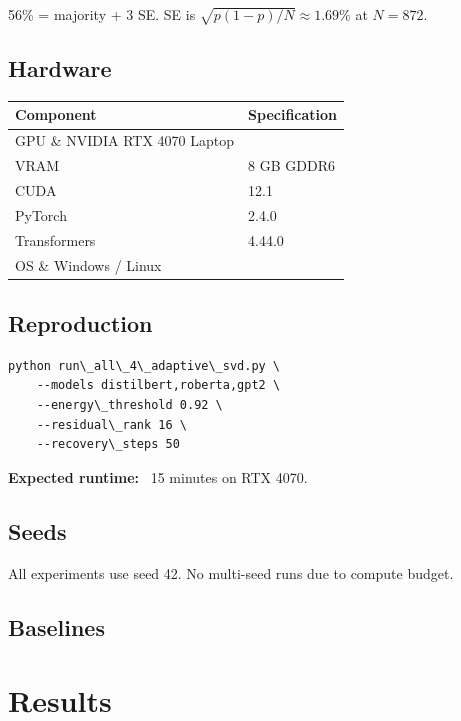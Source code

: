56\% = majority + 3 SE. SE is $\sqrt{p(1-p)/N} \approx 1.69\%$ at $N = 872$.

\subsection{Hardware}

\begin{table}[H]
\centering
\small
\begin{tabular}{ll}
\toprule
\textbf{Component} & \textbf{Specification} \\
\midrule
GPU \& NVIDIA RTX 4070 Laptop \\
VRAM & 8 GB GDDR6 \\
CUDA & 12.1 \\
PyTorch & 2.4.0 \\
Transformers & 4.44.0 \\
OS \& Windows / Linux \\
\bottomrule
\end{tabular}
\end{table}

\subsection{Reproduction}

\begin{lstlisting}
python run\_all\_4\_adaptive\_svd.py \
    --models distilbert,roberta,gpt2 \
    --energy\_threshold 0.92 \
    --residual\_rank 16 \
    --recovery\_steps 50
\end{lstlisting}

\textbf{Expected runtime:} ~15 minutes on RTX 4070.

\subsection{Seeds}

All experiments use seed 42. No multi-seed runs due to compute budget.

\subsection{Baselines}



\section{Results}

